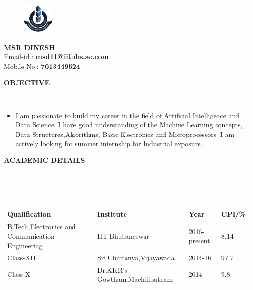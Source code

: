 \documentclass[a4paper,10pt]{article}
\newcommand{\lsep}{-0.5cm}
\newcommand{\resheading}[1]{{\small \colorbox{mygrey}{\begin{minipage}{0.975\textwidth}{\textbf{#1 \vphantom{p\^{E}}}}\end{minipage}}}}
\begin{document}
\linespread{0.25}
\hspace{0.5cm}\\[-0.25cm]
\begin{figure}
\begin{flushleft}
\includegraphics[width=0.145\textwidth, left]{logo}
\end{flushleft}
\end{figure}


\begin{centering}
\bigbreak
\bigbreak
\bigbreak
\bigbreak
\bigbreak
\textbf{MSR DINESH} \\
\noindent Email-id : \textbf{msd11@iitbbs.ac.com} \\
\noindent Mobile No.: \textbf{7013449524} \\
\end{centering}
\bigbreak
\bigbreak
\resheading{\textbf{OBJECTIVE} }\\[\lsep]
\begin{itemize}
\item \noindent I am passionate to  build my career in the field of Artificial Intelligence and Data Science. I have   good understanding of the Machine Learning concepts, Data Structures,Algorithms,  Basic Electronics and  Microprocessors. I am actively looking for summer internship for Industrial exposure.

\end{itemize}


\resheading{\textbf{ACADEMIC DETAILS} }\\[\lsep]
\\ \\
\indent \begin{tabular}{ |l @{\hskip 0.45in}| l @{\hskip 0.45in}| l @{\hskip 0.45in} l|}
\hline
\textbf{Qualification} &  \textbf{Institute} & \textbf{Year} & \textbf{CPI/\%} \\
\hline
B.Tech,Electronics and Communication Engineering & IIT Bhubaneswar & 2016-present & 8.14 \\
Class-XII & Sri Chaitanya,Vijayawada & 2014-16 & 97.7\\
Class-X & Dr.KKR's Gowtham,Machilipatnam & 2014 & 9.8 \\

\hline
\end{tabular}
\\ \\
\end{document}
